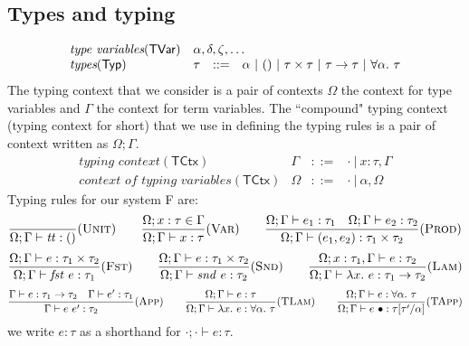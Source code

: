 \documentclass{article}
\newcommand{\gor}{~|~}
\newcommand{\fst}{\mathit{fst}}
\newcommand{\snd}{\mathit{snd}}
\newcommand{\TT}{\mathit{tt}}
\newcommand{\TYP}{\mathsf{Typ}}
\newcommand{\UNT}{()}
\newcommand{\TCTX}{\mathsf{TCtx}}
\newcommand{\TVAR}{\mathsf{TVar}}
\begin{document}
\subsection{Types and typing}
\[
\begin{array}{llll}
\textit{type variables}(\TVAR) & \multicolumn{3}{l}{\alpha, \delta, \zeta, \dots}\\
\textit{types}(\TYP) & \tau &::=& \alpha \gor \UNT \gor \tau \times\tau
\gor \tau \to \tau \gor \forall \alpha.~\tau
\end{array}
\]
The typing context that we consider is a pair of contexts $\Omega$ the context for type variables and $\Gamma$ the context for term variables.
The ``compound" typing context (typing context for short) that we use in defining the typing rules is a pair of context written as $\Omega; \Gamma$.
\[
\begin{array}{llll}
\textit{typing context}(\TCTX) & \Gamma &::=& \cdot \gor x : \tau, \Gamma\\
\textit{context of typing variables}(\TCTX) & \Omega &::=& \cdot \gor \alpha, \Omega
\end{array}
\]
Typing rules for our system F are:
\[
\frac{}{\Omega; \Gamma \vdash \TT : \UNT}(\textsc{Unit})
\hspace{2em}
\frac{\Omega; x : \tau \in \Gamma}{\Omega; \Gamma \vdash x : \tau}(\textsc{Var})
\hspace{2em}
\frac{\Omega; \Gamma \vdash e_1 : \tau_1 \hspace{1em}
\Omega; \Gamma \vdash e_2 : \tau_2}{\Omega; \Gamma \vdash (e_1, e_2) : \tau_1 \times \tau_2}(\textsc{Prod})
\]
\[
\frac{\Omega; \Gamma \vdash e : \tau_1 \times \tau_2}{\Omega; \Gamma \vdash \fst~e : \tau_1}(\textsc{Fst})
\hspace{2em}
\frac{\Omega; \Gamma \vdash e : \tau_1 \times \tau_2}{\Omega; \Gamma \vdash \snd~e : \tau_2}(\textsc{Snd})
\hspace{2em}
\frac{\Omega; x : \tau_1, \Gamma \vdash e : \tau_2}{\Omega; \Gamma \vdash \lambda x.~e : \tau_1 \to \tau_2}(\textsc{Lam})
\]
\[
\frac{\Gamma \vdash e : \tau_1 \to \tau_2 \hspace{1em}
\Gamma \vdash e' : \tau_1}{\Gamma \vdash e~e' : \tau_2}(\textsc{App})
\hspace{2em}
\frac{\Omega; \Gamma \vdash e : \tau}{\Omega; \Gamma \vdash \lambda x.~e : \forall \alpha.~\tau}(\textsc{TLam})
\hspace{2em}
\frac{\Omega; \Gamma \vdash e : \forall \alpha.~\tau}
{\Omega; \Gamma \vdash e~\bullet : \tau[\tau'/\alpha]}(\textsc{TApp})\\
\]
we write $e : \tau$ as a shorthand for $\cdot; \cdot \vdash e : \tau$.
\end{document}

